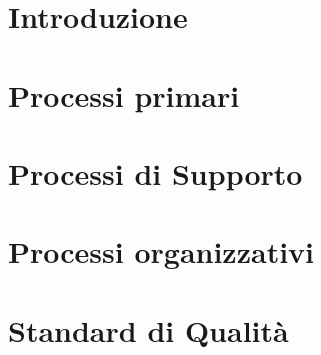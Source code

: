 \documentclass{article}
\begin{document}


\section{Introduzione}%
\label{sec:introduzione}


\newpage

\section{Processi primari}%
\label{sec:processi-primari}


\newpage

\section{Processi di Supporto}%
\label{sec:processi-di-supporto}


\newpage

\section{Processi organizzativi}%
\label{sec:processi-organizzativi}


\newpage

\appendix
\section{Standard di Qualità}

\end{document}
